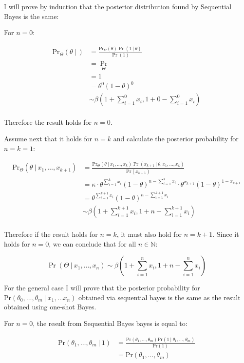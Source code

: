 \documentclass[10pt,\jkfside,a4paper]{article}
\begin{document}
\begin{enumerate}
I will prove by induction that the posterior distribution found by
Sequential Bayes is the same:

For $n = 0$:

\[
\begin{split}
\text{Pr}_\Theta(\theta \ | \ )
&= \frac{\text{Pr}_\Theta(\theta)\Pr(1 \ | \ \theta)}{\Pr(1)} \\
&= \Pr_{\Theta} \\
&= 1 \\
&= \theta^0(1 - \theta)^0 \\
&\sim \beta\left(1 + \sum^{0}_{i=1}x_i, 1 + 0 - \sum^{0}_{i=1}x_i  \right) \\
\end{split}
\]

Therefore the result holds for $n = 0$.

Assume next that it holds for $n = k$ and calculate the posterior
probability for $n = k = 1$:

\[
\begin{split}
\text{Pr}_\Theta(\theta \ | \ x_1, \dots, x_{k+1})
&= \frac{\text{Pr}_\Theta(\theta \ | \ x_1, \dots, x_k)\Pr(x_{k+1} \ | \
\theta, x_1, \dots, x_k)}{\text{Pr}(x_{k+1})} \\
&= \kappa \cdot \theta^{\sum^k_{i=1}x_i}(1 - \theta)^{n - \sum^k_{i=1}x_i}
\cdot \theta^{x_{k+1}}(1 - \theta)^{1 - x_{k+1}} \\
&= \theta^{\sum^{k+1}_{i=1}x_i}(1 - \theta)^{n - \sum^{k+1}_{i=1}x_i} \\
&\sim \beta\left(1 + \sum^{k+1}_{i=1}x_i, 1 + n - \sum^{k+1}_{i=1}x_i\right) \\
\end{split}
\]

Therefore if the result holds for $n = k$, it must also hold for $n = k + 1$.
Since it holds for $n = 0$, we can conclude that for all $n \in \mathbb{N}$:

\[
\Pr(\Theta \ | \ x_1, \dots, x_n) \sim \beta\left(1 + \sum^n_{i=1}x_i, 1 + n -
\sum^n_{i=1}x_i\right)
\]

For the general case I will prove that the posterior probability for
$\text{Pr}(\theta_0, \dots, \theta_m \ | \ x_1, \dots x_n)$ obtained via
sequential bayes is the same as the result obtained using one-shot Bayes.

For $n = 0$, the result from Sequential Bayes bayes is equal to:

\[
\begin{split}
\text{Pr}(\theta_1, \dots, \theta_m \ | \ 1)
&= \frac{\text{Pr}(\theta_1, \dots, \theta_m)\text{Pr}(1 \ | \ \theta_1,
\dots, \theta_m)}{\text{Pr}(1)} \\
&= \text{Pr}(\theta_1, \dots, \theta_m) \\
\end{split}
\]


\end{enumerate}
\end{document}
